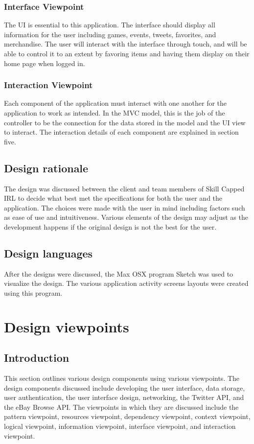 \documentclass[onecolumn, draftclsnofoot,10pt, compsoc]{IEEEtran}
\begin{document}
\subsubsection{Interface Viewpoint}
The UI is essential to this application. The interface should display all information for the user including games, events, tweets, favorites, and merchandise. The user will interact with the interface through touch, and will be able to control it to an extent by favoring items and having them display on their home page when logged in.

\subsubsection{Interaction Viewpoint}
Each component of the application must interact with one another for the application to work as intended. In the MVC model, this is the job of the controller to be the connection for the data stored in the model and the UI view to interact. The interaction details of each component are explained in section five.

\subsection{Design rationale}
The design was discussed between the client and team members of Skill Capped IRL to decide what best met the specifications for both the user and the application. The choices were made with the user in mind including factors such as ease of use and intuitiveness. Various elements of the design may adjust as the development happens if the original design is not the best for the user.

\subsection{Design languages}
After the designs were discussed, the Max OSX program Sketch was used to visualize the design. The various application activity screens layouts were created using this program.

\section{Design viewpoints}

\subsection{Introduction}
This section outlines various design components using various viewpoints. The design components discussed include developing the user interface, data storage, user authentication, the user interface design, networking, the Twitter API, and the eBay Browse API. The viewpoints in which they are discussed include the pattern viewpoint, resources viewpoint, dependency viewpoint, context viewpoint, logical viewpoint, information viewpoint, interface viewpoint, and interaction viewpoint.
\end{document}
